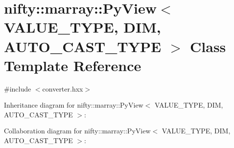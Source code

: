 \hypertarget{classnifty_1_1marray_1_1PyView}{}\section{nifty\+:\+:marray\+:\+:Py\+View$<$ V\+A\+L\+U\+E\+\_\+\+T\+Y\+P\+E, D\+I\+M, A\+U\+T\+O\+\_\+\+C\+A\+S\+T\+\_\+\+T\+Y\+P\+E $>$ Class Template Reference}
\label{classnifty_1_1marray_1_1PyView}


{\ttfamily \#include $<$converter.\+hxx$>$}



Inheritance diagram for nifty\+:\+:marray\+:\+:Py\+View$<$ V\+A\+L\+U\+E\+\_\+\+T\+Y\+P\+E, D\+I\+M, A\+U\+T\+O\+\_\+\+C\+A\+S\+T\+\_\+\+T\+Y\+P\+E $>$\+:


Collaboration diagram for nifty\+:\+:marray\+:\+:Py\+View$<$ V\+A\+L\+U\+E\+\_\+\+T\+Y\+P\+E, D\+I\+M, A\+U\+T\+O\+\_\+\+C\+A\+S\+T\+\_\+\+T\+Y\+P\+E $>$\+:
